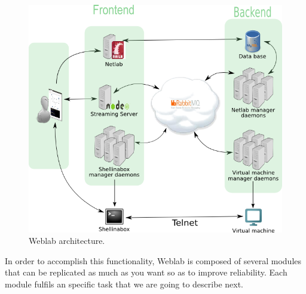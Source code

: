 \documentclass{article}
\begin{document}
\begin{figure}[h!]
  \centering
    \includegraphics[scale=0.6]{./img/weblab.png}
  \caption{Weblab architecture.}
  \label{img:weblab_architecture}
\end{figure}

In order to accomplish this functionality, Weblab is composed of several modules that can be replicated as much as you want so as to improve reliability. Each module fulfils an specific task that we are going to describe next.
\end{document}
